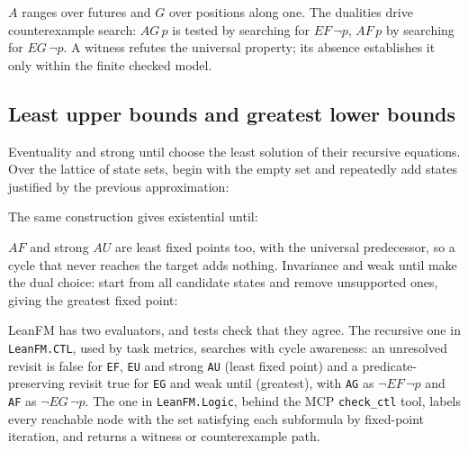 $A$ ranges over futures and $G$ over positions along one. The dualities drive
counterexample search: $AG\,p$ is tested by searching for $EF\,\neg p$, $AF\,p$ by
searching for $EG\,\neg p$. A witness refutes the universal property; its absence
establishes it only within the finite checked model.

\subsection{Least upper bounds and greatest lower bounds}

Eventuality and strong until choose the least solution of their recursive
equations. Over the lattice of state sets, begin with the empty set and
repeatedly add states justified by the previous approximation:


The same construction gives existential until:


$AF$ and strong $AU$ are least fixed points too, with the universal predecessor, so
a cycle that never reaches the target adds nothing. Invariance and weak until make
the dual choice: start from all candidate states and remove unsupported ones,
giving the greatest fixed point:


LeanFM has two evaluators, and tests check that they agree. The recursive one in
\texttt{LeanFM.CTL}, used by task metrics, searches with cycle awareness: an
unresolved revisit is false for \texttt{EF}, \texttt{EU} and strong \texttt{AU}
(least fixed point) and a predicate-preserving revisit true for \texttt{EG} and
weak until (greatest), with \texttt{AG} as $\neg EF\,\neg p$ and \texttt{AF} as
$\neg EG\,\neg p$. The one in \texttt{LeanFM.Logic}, behind the MCP
\texttt{check\_ctl} tool, labels every reachable node with the set satisfying each
subformula by fixed-point iteration, and returns a witness or counterexample
path.

